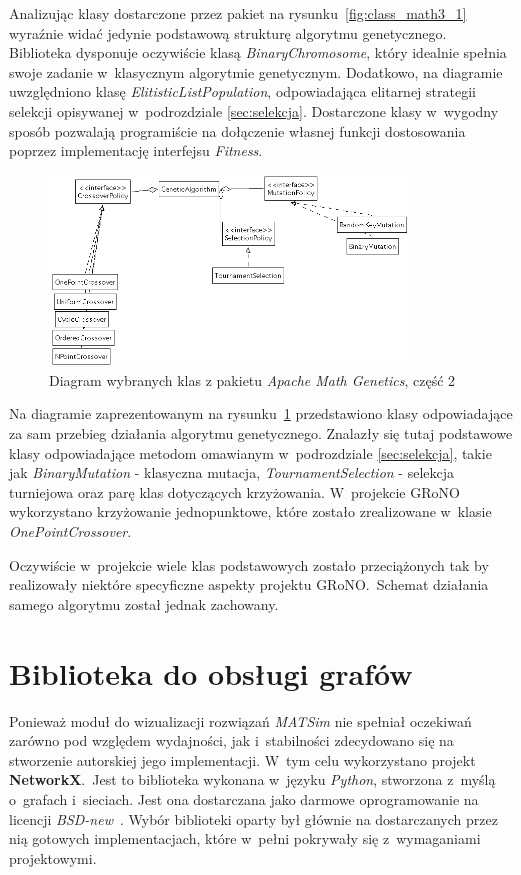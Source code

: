 \documentclass[twoside,12pt]{report}
\begin{document}
Analizując klasy dostarczone przez pakiet na rysunku~\ref{fig:class_math3_1} wyraźnie widać jedynie podstawową strukturę algorytmu genetycznego. Biblioteka dysponuje oczywiście klasą \textit{BinaryChromosome}, który idealnie spełnia swoje zadanie w~klasycznym algorytmie genetycznym. Dodatkowo, na diagramie uwzględniono klasę \textit{ElitisticListPopulation}, odpowiadająca elitarnej strategii selekcji opisywanej w~podrozdziale \ref{sec:selekcja}. Dostarczone klasy w~wygodny sposób pozwalają programiście na dołączenie własnej funkcji dostosowania poprzez implementację interfejsu \textit{Fitness}.

\begin{figure}[htbp]
	\centering
	\includegraphics[width=0.85\textwidth]{img/math3-2}
	\caption{Diagram wybranych klas z pakietu \textit{Apache Math Genetics}, część 2}
	\label{fig:class_math3_2}
\end{figure}

Na diagramie zaprezentowanym na rysunku~\ref{fig:class_math3_2} przedstawiono klasy odpowiadające za sam przebieg działania algorytmu genetycznego. Znalazły się tutaj podstawowe klasy odpowiadające metodom omawianym w~podrozdziale \ref{sec:selekcja}, takie jak \textit{BinaryMutation} - klasyczna mutacja, \textit{TournamentSelection} - selekcja turniejowa oraz parę klas dotyczących krzyżowania. W~projekcie GRoNO wykorzystano krzyżowanie jednopunktowe, które zostało zrealizowane w~klasie \textit{OnePointCrossover}.

Oczywiście w~projekcie wiele klas podstawowych zostało przeciążonych tak by realizowały niektóre specyficzne aspekty projektu GRoNO.~Schemat działania samego algorytmu został jednak zachowany.

\section{Biblioteka do obsługi grafów}\label{rozdz.obsluga_grafow}
Ponieważ moduł do wizualizacji rozwiązań \textit{MATSim} nie spełniał  oczekiwań zarówno pod względem wydajności, jak i~stabilności zdecydowano się na stworzenie autorskiej jego implementacji. W~tym celu wykorzystano projekt \textbf{NetworkX}.~Jest to biblioteka wykonana w~języku \textit{Python}, stworzona z~myślą o~grafach i~sieciach. Jest ona dostarczana jako darmowe oprogramowanie na licencji \textit{BSD-new}~\cite{networkx}. Wybór biblioteki oparty był głównie na dostarczanych przez nią gotowych implementacjach, które w~pełni pokrywały się z~wymaganiami projektowymi.
\end{document}
